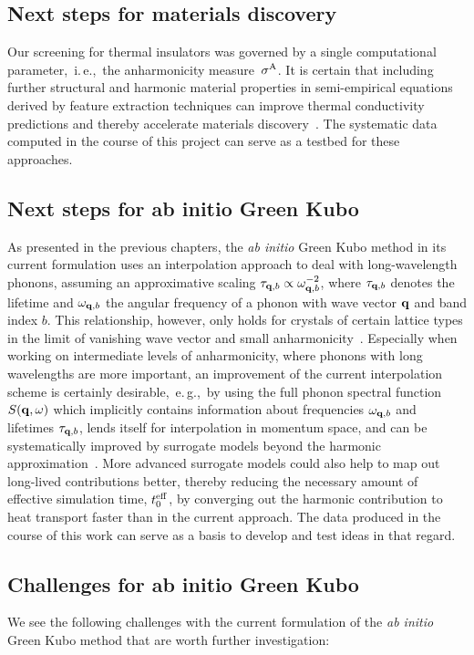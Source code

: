 \subsection{Next steps for materials discovery}
Our screening for thermal insulators was governed by a single computational parameter,~i.\,e.,~the anharmonicity measure~$\sigma^\mathrm{A}$. It is certain that including further structural and harmonic material properties in semi-empirical equations derived by feature extraction techniques can improve thermal conductivity predictions and thereby accelerate materials discovery~\cite{ouyang2018,goldsmith2017,Chen2019,Purcell2021}. The systematic data computed in the course of this project can serve as a testbed for these approaches.

\subsection{Next steps for ab initio Green Kubo}
As presented in the previous chapters, the \emph{ab initio} Green Kubo method in its current formulation uses an interpolation approach to deal with long-wavelength phonons, assuming an approximative scaling $\tau_{{\bf q}, b} \propto \omega^{-2}_{{\bf q}, b}$, where $\tau_{{\bf q}, b}$ denotes the lifetime and $\omega_{{\bf q}, b}$ the angular frequency of a phonon with wave vector ${\bf q}$ and band index $b$. This relationship, however, only holds for crystals of certain lattice types in the limit of vanishing wave vector and small anharmonicity~\cite{Herring1954}. Especially when working on intermediate levels of anharmonicity, where phonons with long wavelengths are more important, an improvement of the current interpolation scheme is certainly desirable,~e.\,g.,~by using the full phonon spectral function $S({\bf q}, \omega)$ which implicitly contains information about frequencies $\omega_{{\bf q}, b}$ and lifetimes $\tau_{{\bf q}, b}$, lends itself for interpolation in momentum space, and can be systematically improved by surrogate models beyond the harmonic approximation~\cite{Maradudin1962}. More advanced surrogate models could also help to map out long-lived contributions better, thereby reducing the necessary amount of effective simulation time, $t^{\rm eff}_0$, by converging out the harmonic contribution to heat transport faster than in the current approach. The data produced in the course of this work can serve as a basis to develop and test ideas in that regard.


\subsection{Challenges for ab initio Green Kubo}
We see the following challenges with the current formulation of the \emph{ab initio} Green Kubo method that are worth further investigation: 

